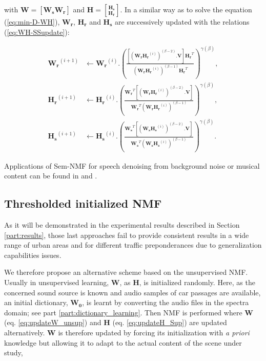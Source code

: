 \documentclass[twocolumn]{svjour3}          %
\begin{document}
 with $\mathbf{W} = \left[\mathbf{W_s} \mathbf{W_r} \right]$ and $\mathbf{H} = \genfrac[]{0pt}{0}{\mathbf{H_s}}{\mathbf{H_r}}$. In a similar way as to solve the equation (\ref{eq:min-D-WH}), $\mathbf{W_r}$, $\mathbf{H_r}$ and $\mathbf{H_s}$ are successively updated with the relations (\ref{eq:WH-SSupdate}):

{\scriptsize
\begin{subequations}\label{eq:WH-SSupdate}
\begin{align}
\mathbf{W_r}^{(i+1)} &\leftarrow \mathbf{W_r}^{(i)}.\left(\frac{\left[\left(\mathbf{W_r H_r}^{(i)} \right)^{(\beta-2)}.\mathbf{V} \right]\mathbf{H_r}^T}{\left(\mathbf{W_r H_r}^{(i)} \right)^{(\beta-1)}\mathbf{H_r}^T}\right)^{\gamma(\beta)}, \label{eq:W_r_SS}\\
\mathbf{H_r}^{(i+1)} &\leftarrow \mathbf{H_r}^{(i)}.\left(\frac{\mathbf{W_r}^T \left[\left(\mathbf{W_r H_r}^{(i)} \right)^{(\beta-2)}.\mathbf{V} \right]}{\mathbf{W_r}^T \left(\mathbf{W_r H_r}^{(i)} \right)^{(\beta-1)}}\right)^{\gamma(\beta)}, \label{eq:H_r_SS}\\
\mathbf{H_s}^{(i+1)} &\leftarrow \mathbf{H_s}^{(i)}.\left(\frac{\mathbf{W_s}^T \left[\left(\mathbf{W_s H_s}^{(i)} \right)^{(\beta-2)}.\mathbf{V} \right]}{\mathbf{W_s}^T \left(\mathbf{W_s H_s}^{(i)} \right)^{(\beta-1)}}\right)^{\gamma(\beta)}.\label{eq:H_s_SS}
\end{align}
\end{subequations}}

Applications of Sem-NMF for speech denoising from background noise or musical content can be found in \cite{joder2012real} and \cite{weninger2012supervised}.

\subsection{Thresholded initialized NMF}

As it will be demonstrated in the experimental results described in Section \ref{part:results}, those last approaches fail to provide consistent results in a wide range of urban areas and for different traffic preponderances due to generalization capabilities issues.

We therefore propose an alternative scheme based on the unsupervised NMF. Usually in unsupervised learning, $\mathbf{W}$, as  $\mathbf{H}$, is initialized randomly. Here, as the concerned sound source is known and audio samples of car passages are available, an initial dictionary, $\mathbf{W_0}$, is learnt by converting the audio files in the spectra domain; see part \ref{part:dictionary_learning}. Then NMF is performed where $\mathbf{W}$ (eq. \ref{eq:updateW_unsup}) and $\mathbf{H}$ (eq.  \ref{eq:updateH_Sup}) are updated alternatively. $\mathbf{W}$ is therefore updated by forcing its initialization with \textit{a priori} knowledge but allowing it to adapt to the actual content of the scene under study,
\end{document}

